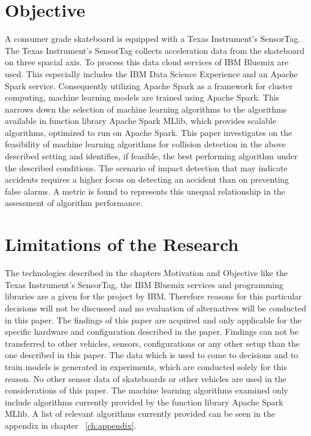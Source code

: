 \section{Objective}
A consumer grade skateboard is equipped with a Texas Instrument’s SensorTag. The Texas Instrument’s SensorTag collects acceleration data from the skateboard on three spacial axis. To process this data cloud services of IBM Bluemix are used. This especially includes the IBM Data Science Experience and an Apache Spark service. Consequently utilizing Apache Spark as a framework for cluster computing, machine learning models are trained using Apache Spark. This narrows down the selection of machine learning algorithms to the algorithms available in function library Apache Spark MLlib, which provides scalable algorithms, optimized to run on Apache Spark. 
\newline
This paper investigates on the feasibility of machine learning algorithms for collision detection in the above described setting and identifies, if feasible, the best performing algorithm under the described conditions.   \newline
The  scenario of impact detection that may indicate accidents requires a higher focus on detecting an accident than on preventing false alarms. A metric is found to represents this unequal relationship in the assessment of algorithm performance.

\section{Limitations of the Research}
The technologies described in the chapters Motivation and Objective like the Texas Instrument’s SensorTag, the IBM Bluemix services and programming libraries are a given for the project by IBM. Therefore reasons for this particular decisions will not be discussed and no evaluation of alternatives will be conducted in this paper.
The findings of this paper are acquired and only applicable for the specific hardware and configuration described in the paper. Findings can not be transferred to other vehicles, sensors, configurations or any other setup than the one described in this paper.
The data which is used to come to decisions and to train models is generated in experiments, which are conducted solely for this reason. No other sensor data of skateboards or other vehicles are used in the considerations of this paper.
The machine learning algorithms examined only include algorithms currently provided by the function library Apache Spark MLlib. A list of relevant algorithms currently provided can be seen in the appendix in chapter ~\ref{ch:appendix}.

